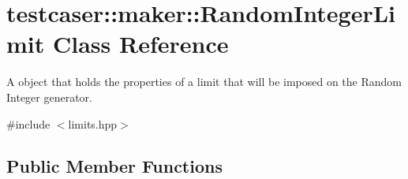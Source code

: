 \hypertarget{classtestcaser_1_1maker_1_1RandomIntegerLimit}{}\section{testcaser\+:\+:maker\+:\+:Random\+Integer\+Limit Class Reference}
\label{classtestcaser_1_1maker_1_1RandomIntegerLimit}


A object that holds the properties of a limit that will be imposed on the Random Integer generator.  




{\ttfamily \#include $<$limits.\+hpp$>$}

\subsection*{Public Member Functions}
